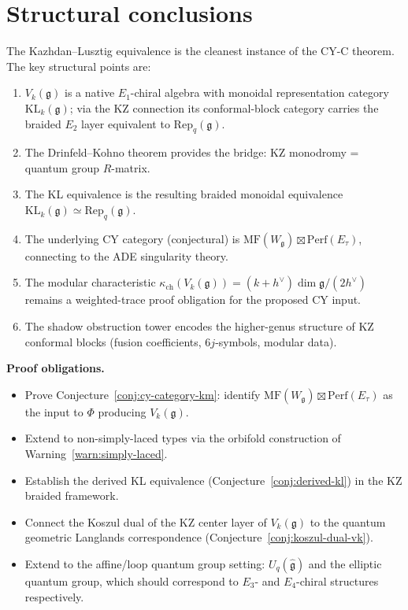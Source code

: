 \documentclass[11pt]{article}
\theoremstyle{definition}
\theoremstyle{remark}
\newcommand{\Rep}{\mathrm{Rep}}
\newcommand{\Perf}{\mathrm{Perf}}
\newcommand{\MF}{\mathrm{MF}}
\newcommand{\Uq}{U_q}
\newcommand{\frakg}{\mathfrak{g}}
\newcommand{\KL}{\mathrm{KL}}
\newcommand{\hv}{h^\vee}
\begin{document}
\section{Structural conclusions}
\label{sec:structural-conclusions}

The Kazhdan--Lusztig equivalence is the cleanest instance of the
CY-C theorem. The key structural points are:

\begin{enumerate}[label=(\arabic*)]
 \item $V_k(\frakg)$ is a native $E_1$-chiral algebra with monoidal
 representation category $\KL_k(\frakg)$; via the KZ connection its
 conformal-block category carries the braided $E_2$ layer equivalent to
 $\Rep_q(\frakg)$.
 \item The Drinfeld--Kohno theorem provides the bridge: KZ monodromy
 = quantum group $R$-matrix.
 \item The KL equivalence is the resulting braided monoidal equivalence
 $\KL_k(\frakg) \simeq \Rep_q(\frakg)$.
 \item The underlying CY category (conjectural) is
 $\MF(W_\frakg) \boxtimes \Perf(E_\tau)$, connecting to the ADE
 singularity theory.
 \item The modular characteristic
 $\kappa_{\mathrm{ch}}(V_k(\frakg)) = (k+\hv)\dim\frakg/(2\hv)$
 remains a weighted-trace proof obligation for the proposed CY input.
 \item The shadow obstruction tower encodes the higher-genus structure of KZ
 conformal blocks (fusion coefficients, $6j$-symbols, modular data).
\end{enumerate}

\medskip
\noindent\textbf{Proof obligations.}
\begin{itemize}
 \item Prove Conjecture~\ref{conj:cy-category-km}: identify $\MF(W_\frakg) \boxtimes \Perf(E_\tau)$
 as the input to $\Phi$ producing $V_k(\frakg)$.
 \item Extend to non-simply-laced types via the orbifold construction
 of Warning~\ref{warn:simply-laced}.
 \item Establish the derived KL equivalence (Conjecture~\ref{conj:derived-kl})
 in the KZ braided framework.
 \item Connect the Koszul dual of the KZ center layer of
 $V_k(\frakg)$ to the quantum geometric Langlands correspondence
 (Conjecture~\ref{conj:koszul-dual-vk}).
 \item Extend to the affine/loop quantum group setting: $\Uq(\hat{\frakg})$
 and the elliptic quantum group, which should correspond to $E_3$-
 and $E_4$-chiral structures respectively.
\end{itemize}
\end{document}
